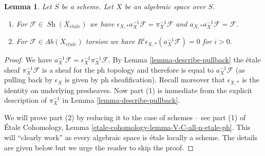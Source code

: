 \documentclass{stacks-project}
\theoremstyle{plain}
\newtheorem{lemma}[subsection]{Lemma}
\theoremstyle{definition}
\theoremstyle{remark}
\numberwithin{equation}{subsection}
\def\Sh{\mathop{\mathit{Sh}}\nolimits}
\def\etale{{\acute{e}tale}}
\begin{document}
\begin{lemma}
\label{lemma-comparison-ph-etale}
Let $S$ be a scheme. Let $X$ be an algebraic space over $S$.
\begin{enumerate}
\item For $\mathcal{F} \in \Sh(X_\etale)$ we have
$\epsilon_{X, *}a_X^{-1}\mathcal{F} = \pi_X^{-1}\mathcal{F}$
and $a_{X, *}a_X^{-1}\mathcal{F} = \mathcal{F}$.
\item For $\mathcal{F} \in \textit{Ab}(X_\etale)$ torsion we have
$R^i\epsilon_{X, *}(a_X^{-1}\mathcal{F}) = 0$ for $i > 0$.
\end{enumerate}
\end{lemma}

\begin{proof}
We have $a_X^{-1}\mathcal{F} = \epsilon_X^{-1} \pi_X^{-1}\mathcal{F}$.
By Lemma \ref{lemma-describe-pullback} the \'etale sheaf
$\pi_X^{-1}\mathcal{F}$ is a sheaf for the ph topology
and therefore is equal to $a_X^{-1}\mathcal{F}$ (as pulling
back by $\epsilon_X$ is given by ph sheafification).
Recall moreover that $\epsilon_{X, *}$ is the identity
on underlying presheaves.
Now part (1) is immediate from the explicit description of $\pi_X^{-1}$
in Lemma \ref{lemma-describe-pullback}.

\medskip\noindent
We will prove part (2) by reducing it to the case of schemes --
see part (1) of
\'Etale Cohomology, Lemma \ref{etale-cohomology-lemma-V-C-all-n-etale-ph}.
This will ``clearly work'' as every algebraic space is
\'etale locally a scheme. The details are given below but we urge
the reader to skip the proof.


\end{proof}
\end{document}
